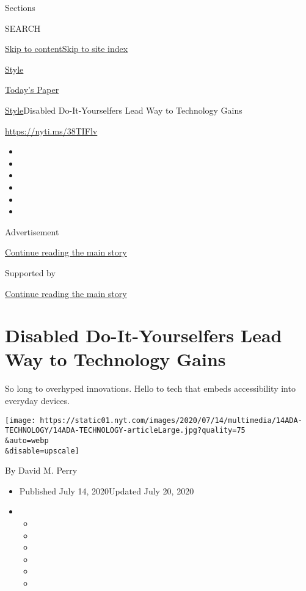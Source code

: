 Sections

SEARCH

\protect\hyperlink{site-content}{Skip to
content}\protect\hyperlink{site-index}{Skip to site index}

\href{https://www.nytimes.com/section/style}{Style}

\href{https://myaccount.nytimes.com/auth/login?response_type=cookie\&client_id=vi}{}

\href{https://www.nytimes.com/section/todayspaper}{Today's Paper}

\href{/section/style}{Style}\textbar{}Disabled Do-It-Yourselfers Lead
Way to Technology Gains

\href{https://nyti.ms/38TIFlv}{https://nyti.ms/38TIFlv}

\begin{itemize}
\item
\item
\item
\item
\item
\item
\end{itemize}

Advertisement

\protect\hyperlink{after-top}{Continue reading the main story}

Supported by

\protect\hyperlink{after-sponsor}{Continue reading the main story}

\hypertarget{disabled-do-it-yourselfers-lead-way-to-technology-gains}{%
\section{Disabled Do-It-Yourselfers Lead Way to Technology
Gains}\label{disabled-do-it-yourselfers-lead-way-to-technology-gains}}

So long to overhyped innovations. Hello to tech that embeds
accessibility into everyday devices.

\texttt{[image: https://static01.nyt.com/images/2020/07/14/multimedia/14ADA-TECHNOLOGY/14ADA-TECHNOLOGY-articleLarge.jpg?quality=75\\\&auto=webp\\\&disable=upscale]}

By David M. Perry

\begin{itemize}
\item
  Published July 14, 2020Updated July 20, 2020
\item
  \begin{itemize}
  \item
  \item
  \item
  \item
  \item
  \item
  \end{itemize}
\end{itemize}

